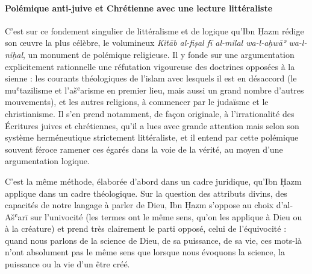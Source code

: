 \paragraph{Polémique anti-juive et Chrétienne avec une lecture littéraliste}C'est sur ce fondement singulier de littéralisme et de logique qu'Ibn
Ḥazm rédige son œuvre la plus célèbre, le volumineux \emph{Kitāb
al-fiṣal fī al-milal wa-l-aḥwāʾ wa-l-niḥal}, un monument de polémique
religieuse. Il y fonde sur une argumentation explicitement rationnelle
une réfutation vigoureuse des doctrines opposées à la sienne : les
courants théologiques de l'islam avec lesquels il est en désaccord (le
muʿtazilisme et l'ašʿarisme en
premier lieu, mais aussi un grand nombre d'autres mouvements), et les
autres religions, à commencer par le judaïsme et le christianisme. Il
s'en prend notamment, de façon originale, à l'irrationalité des
Écritures juives et chrétiennes, qu'il a lues avec grande attention mais
selon son système herméneutique strictement littéraliste, et il entend
par cette polémique souvent féroce ramener ces égarés dans la voie de la
vérité, au moyen d'une argumentation logique.

C'est la même méthode, élaborée d'abord dans un cadre juridique, qu'Ibn
Ḥazm applique dans un cadre théologique. Sur la question des attributs
divins, des capacités de notre langage à parler de Dieu, Ibn Ḥazm
s'oppose au choix d'al-Ašʿarī sur l'univocité (les termes ont le même
sens, qu'on les applique à Dieu ou à la créature) et prend très
clairement le parti opposé, celui de l'équivocité : quand nous parlons
de la science de Dieu, de sa puissance, de sa vie, ces mots-là n'ont
absolument pas le même sens que lorsque nous évoquons la science, la
puissance ou la vie d'un être créé.

